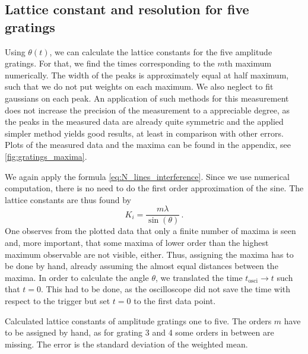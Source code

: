 \subsection{Lattice constant and resolution for five gratings}
Using $\theta(t)$, we can calculate the lattice constants for the five amplitude gratings. 
For that, we find the times corresponding to the $m$th maximum numerically. The width 
of the peaks is approximately equal at half maximum, such that we do not put weights 
on each maximum. We also neglect to fit gaussians on each peak. An application of such methods 
for this measurement does not increase the precision of the measurement to a appreciable degree, 
as the peaks in the measured data are already quite symmetric and the applied simpler method yields 
good results, at least in comparison with other errors. 
Plots of the measured data and the maxima can be found in the appendix, see 
\ref{fig:gratings_maxima}. 

We again apply the formula \ref{eq:N_lines_interference}. Since we use numerical computation, 
there is no need to do the first order approximation of the sine. The lattice constants are thus 
found by
\begin{equation}
    K_i = \frac{m\lambda}{\sin(\theta)}\, .
\end{equation}
One observes from the plotted data that only a finite number of maxima is seen and, more important, 
that some maxima of lower order than the highest maximum observable are not visible, either. 
Thus, assigning the maxima has to be done by hand, already assuming the almost equal distances between the 
maxima. In order to calculate the angle $\theta$, we translated the time $t_\mathrm{osci} \rightarrow t$ 
such that $t = 0$. 
This had to be done, as the oscilloscope did not save the time with respect to the trigger 
but set $t = 0$ to the first data point. 

\begin{table}[htdp]
    \centering
    
    \caption{
        Calculated lattice constants of amplitude gratings one to five. 
        The orders $m$ have to be assigned by hand, as for grating 3 and 4 some 
        orders in between are missing. The error is the standard deviation of 
        the weighted mean.
        }
    \label{tab:gratings_K}
\end{table}


